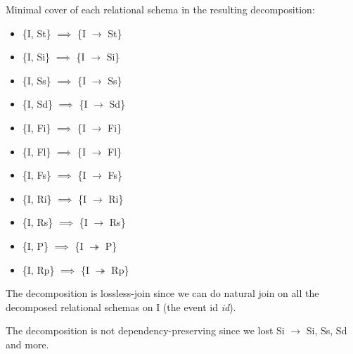 \documentclass[12pt]{article}
\begin{document}
\begin{enumerate}
        Minimal cover of each relational schema in the resulting decomposition:
        \begin{itemize}
          \item \{I, St\} $\implies$ \{I $\longrightarrow$ St\}
          \item \{I, Si\} $\implies$ \{I $\longrightarrow$ Si\}
          \item \{I, Ss\} $\implies$ \{I $\longrightarrow$ Ss\}
          \item \{I, Sd\} $\implies$ \{I $\longrightarrow$ Sd\}
          \item \{I, Fi\} $\implies$ \{I $\longrightarrow$ Fi\}
          \item \{I, Fl\} $\implies$ \{I $\longrightarrow$ Fl\}
          \item \{I, Fs\} $\implies$ \{I $\longrightarrow$ Fs\}
          \item \{I, Ri\} $\implies$ \{I $\longrightarrow$ Ri\}
          \item \{I, Rs\} $\implies$ \{I $\longrightarrow$ Rs\}
          \item \{I, P\} $\implies$ \{I $\twoheadrightarrow$ P\}
          \item \{I, Rp\} $\implies$ \{I $\twoheadrightarrow$ Rp\}
        \end{itemize}

        The decomposition is lossless-join since we can do natural join on all
        the decomposed relational schemas on I (the event id \emph{id}).

        The decomposition is not dependency-preserving since we lost Si
        $\longrightarrow$ Si, Ss, Sd and more.


\end{enumerate}
\end{document}
